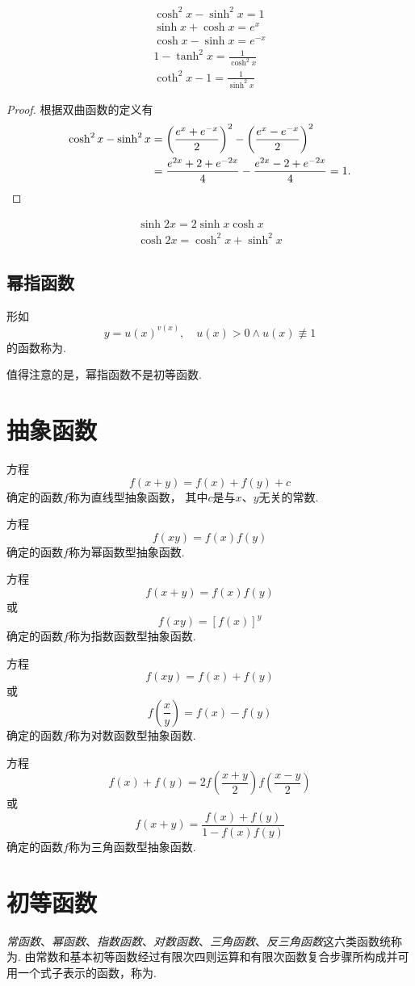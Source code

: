 \begin{theorem}
\begin{gather}
\cosh^2{x} - \sinh^2{x} = 1 \\
\sinh{x} + \cosh{x} = e^x \\
\cosh{x} - \sinh{x} = e^{-x} \\
1 - \tanh^2{x} = \frac{1}{\cosh^2{x}} \\
\coth^2{x} - 1 = \frac{1}{\sinh^2{x}}
\end{gather}
\begin{proof}
根据双曲函数的定义有
\begin{align*}
\cosh^2{x}-\sinh^2{x}
&=\left(\frac{e^x + e^{-x}}{2}\right)^2-\left(\frac{e^x - e^{-x}}{2}\right)^2 \\
&=\frac{e^{2x}+2+e^{-2x}}{4}-\frac{e^{2x}-2+e^{-2x}}{4}
=1. \qedhere
\end{align*}
\end{proof}
\end{theorem}

\begin{theorem}
\begin{gather}
\sinh{2x} = 2 \sinh{x}\cosh{x} \\
\cosh{2x} = \cosh^2{x} + \sinh^2{x}
\end{gather}
\end{theorem}

\subsection{幂指函数}
\begin{definition}
形如\[
y = u(x)^{v(x)},
\quad u(x) > 0 \land u(x) \not\equiv 1
\]的函数称为.
\end{definition}
值得注意的是，幂指函数不是初等函数.

\section{抽象函数}
方程\[
f(x+y) = f(x) + f(y) + c
\]确定的函数\(f\)称为直线型抽象函数，%
其中\(c\)是与\(x\)、\(y\)无关的常数.

方程\[
f(xy) = f(x) f(y)
\]确定的函数\(f\)称为幂函数型抽象函数.

方程\[
f(x+y) = f(x) f(y)
\]或\[
f(xy) = [f(x)]^y
\]确定的函数\(f\)称为指数函数型抽象函数.

方程\[
f(xy) = f(x) + f(y)
\]或\[
f\left(\frac{x}{y}\right) = f(x) - f(y)
\]确定的函数\(f\)称为对数函数型抽象函数.

方程\[
f(x) + f(y) = 2 f\left(\frac{x+y}{2}\right) f\left(\frac{x-y}{2}\right)
\]或\[
f(x+y) = \frac{f(x) + f(y)}{1 - f(x) f(y)}
\]确定的函数\(f\)称为三角函数型抽象函数.

\section{初等函数}
\begin{definition}
\emph{常函数}、\emph{幂函数}、\emph{指数函数}、\emph{对数函数}、\emph{三角函数}、\emph{反三角函数}这六类函数统称为.
由常数和基本初等函数经过有限次四则运算和有限次函数复合步骤所构成并可用一个式子表示的函数，称为.
\end{definition}
